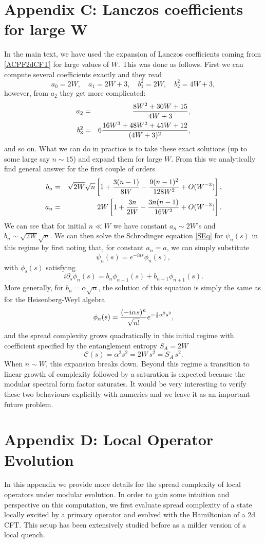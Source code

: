 \documentclass[aps,prl,twocolumn,showpacs,preprintnumbers,amsmath,amssymb]{revtex4-1}
\def\frac#1#2{{#1\over #2}}
\def\be{\begin{equation}}
\def\ee{\end{equation}}
\newcommand{\bea}{\begin{eqnarray}}
\newcommand{\eea}{\end{eqnarray}}
\begin{document}
\section{Appendix C: Lanczos coefficients for large W }\label{AppendixC}
In the main text, we have used the expansion of Lanczos coefficients coming from \eqref{ACPF2dCFT} for large values of $W$. This was done as follows. First we can compute several coefficients exactly and they read
\be
a_0=2W,\quad a_1=2W+3,\quad b^2_1=2W,\quad b^2_2=4W+3,
\ee
however, from $a_2$ they get more complicated:
\bea
a_2&=&\frac{8W^2+30W+15}{4W+3},\nonumber\\
b^2_3&=&6\frac{16W^3+48W^2+45W+12}{(4W+3)^2},
\eea
and so on. What we can do in practice is to take these exact solutions (up to some large say $n\sim 15$) and expand them for large $W$. From this we analytically find general answer for the first couple of orders
\bea
b_n&=& \sqrt{2W}\sqrt{n}\left[1+\frac{3(n-1)}{8W}-\frac{9(n-1)^2}{128W^2}+O(W^{-3})\right],\nonumber\\
a_n&=&2W\left[1+\frac{3n}{2W}-\frac{3n(n-1)}{16W^2}+O(W^{-3})\right].\label{anbnExp}
\eea
We can see that for initial $n\ll W$ we have constant $a_n\sim 2W$'s and $b_n\sim\sqrt{2W}\sqrt{n}$. We can then solve the Schrodinger equation \eqref{SEq} for $\psi_n(s)$ in this regime by first noting that, for constant $a_n=a$, we can simply substitute
\be
\psi_n(s)=e^{-ia s}\phi_n(s),
\ee
with $\phi_s(s)$ satisfying
\be
i\partial_s\phi_n(s)=b_n\phi_{n-1}(s)+b_{n+1}\phi_{n+1}(s).
\ee
More generally, for $b_n=\alpha\sqrt{n}$, the solution of this equation is simply the same as for the Heisenberg-Weyl algebra \cite{Caputa:2021sib}
\be
\phi_n(s)=\frac{(-i\alpha s)^n}{\sqrt{n!}}e^{-\frac{1}{2}\alpha^2s^2},
\ee
and the spread complexity grows quadratically in this initial regime with coefficient specified by the entanglement entropy $S_A=2W$
\be
\mathcal{C}(s)=\alpha^2 s^2=2W\,s^2=S_A\, s^2.
\ee
When $n\sim W$, this expansion breaks down. Beyond this regime a transition to linear growth of complexity followed by a saturation is expected because the modular spectral form factor saturates.  It would be very interesting to verify these two behaviours explicitly with numerics and we leave it as an important future problem. 



\section{Appendix D: Local Operator Evolution}\label{AppendixD}
In this appendix we provide more details for the spread complexity of local operators under modular evolution. In order to gain some intuition and perspective on this computation, we first evaluate spread complexity of a state locally excited by a primary operator and evolved with the Hamiltonian of a 2d CFT. This setup has been extensively studied before \cite{Nozaki:2014hna,He:2014mwa,Caputa:2014vaa,Caputa:2014eta} as a milder version of a local quench. 
\end{document}
